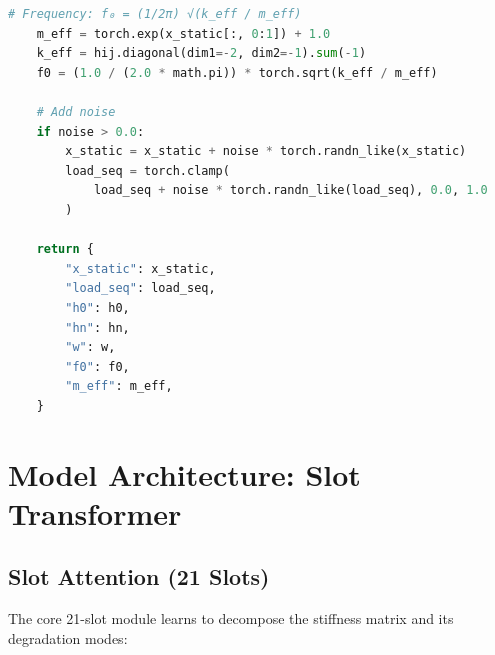 \documentclass[11pt]{article}
\begin{document}
\begin{lstlisting}[language=Python, title=data.py]
    # Frequency: f₀ = (1/2π) √(k_eff / m_eff)
    m_eff = torch.exp(x_static[:, 0:1]) + 1.0
    k_eff = hij.diagonal(dim1=-2, dim2=-1).sum(-1)
    f0 = (1.0 / (2.0 * math.pi)) * torch.sqrt(k_eff / m_eff)

    # Add noise
    if noise > 0.0:
        x_static = x_static + noise * torch.randn_like(x_static)
        load_seq = torch.clamp(
            load_seq + noise * torch.randn_like(load_seq), 0.0, 1.0
        )

    return {
        "x_static": x_static,
        "load_seq": load_seq,
        "h0": h0,
        "hn": hn,
        "w": w,
        "f0": f0,
        "m_eff": m_eff,
    }
\end{lstlisting}

\section{Model Architecture: Slot Transformer}

\subsection{Slot Attention (21 Slots)}

The core 21-slot module learns to decompose the stiffness matrix and its degradation modes:
\end{document}
